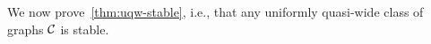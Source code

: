     
    
    

We now prove~\cref{thm:uqw-stable}, i.e.,
that any uniformly quasi-wide  class of graphs $\mathcal{C}$ is stable.

